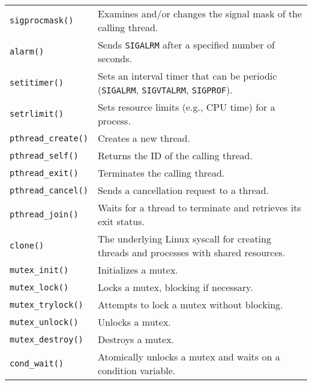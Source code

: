 \documentclass[openany,12pt]{book}
\newcommand{\code}[1]{\texttt{#1}}
\begin{document}
\begin{longtable}{|>{\raggedright\arraybackslash}p{3.5cm}|>{\raggedright\arraybackslash}p{11.5cm}|}
  \code{sigprocmask()} & Examines and/or changes the signal mask of the calling thread.                                  \\
  \code{alarm()}    & Sends \code{SIGALRM} after a specified number of seconds.                                         \\
  \code{setitimer()} & Sets an interval timer that can be periodic (\code{SIGALRM}, \code{SIGVTALRM}, \code{SIGPROF}).    \\
  \code{setrlimit()} & Sets resource limits (e.g., CPU time) for a process.                                              \\
  \hline
  \code{pthread\_create()} & Creates a new thread.                                                                       \\
  \code{pthread\_self()} & Returns the ID of the calling thread.                                                         \\
  \code{pthread\_exit()} & Terminates the calling thread.                                                                \\
  \code{pthread\_cancel()} & Sends a cancellation request to a thread.                                                   \\
  \code{pthread\_join()} & Waits for a thread to terminate and retrieves its exit status.                                \\
  \code{clone()}    & The underlying Linux syscall for creating threads and processes with shared resources.            \\
  \hline
  \code{mutex\_init()} & Initializes a mutex.                                                                          \\
  \code{mutex\_lock()} & Locks a mutex, blocking if necessary.                                                           \\
  \code{mutex\_trylock()} & Attempts to lock a mutex without blocking.                                                    \\
  \code{mutex\_unlock()} & Unlocks a mutex.                                                                              \\
  \code{mutex\_destroy()} & Destroys a mutex.                                                                             \\
  \code{cond\_wait()} & Atomically unlocks a mutex and waits on a condition variable.                                     \\

\end{longtable}
\end{document}

